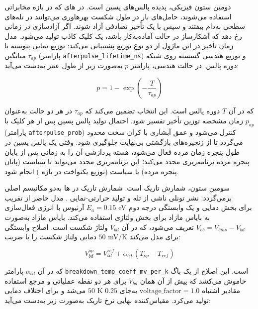 دومین ستون فیزیکی، پدیده پالس‌های پسین  است. در های  که در بازه مخابراتی  استفاده می‌شوند، حامل‌های بار در طول شکست بهرهاوری می‌توانند در تله‌های سطحی  به‌دام بیفتند و سپس با یک تأخیر تصادفی آزاد شوند. اگر آزادسازی در زمانی رخ دهد که آشکارساز در حالت آماده‌به‌کار باشد، یک کلیک کاذب  تولید می‌شود. مدل زمان تأخیر در این ماژول از دو نوع توزیع پشتیبانی می‌کند: توزیع نمایی پیوسته با میانگین $\tau_{ap}$ (پارامتر \texttt{afterpulse\_lifetime\_ns}) و توزیع هندسی گسسته روی شبکه دوره پالس. در حالت هندسی، پارامتر $p$ به‌صورت زیر از طول عمر به‌دست می‌آید:

\begin{equation}
	p = 1 - \exp\left(-\frac{T}{\tau_{ap}}\right)
\end{equation}

که در آن $T$ دوره پالس  است. این انتخاب تضمین می‌کند که $\tau_{ap}$ در هر دو حالت به‌عنوان زمان مشخصه توزین تأخیر تفسیر شود. احتمال تولید پالس پسین پس از هر کلیک با $p_{ap}$ (پارامتر \texttt{afterpulse\_prob}) کنترل می‌شود و عمق آبشاری  با کران سخت  محدود می‌گردد تا از زنجیره‌های بازگشتی بی‌نهایت جلوگیری شود. وقتی یک پالس پسین در طول پنجره زمان مرده فعال می‌شود، هسته پردازشی آن را به زمانی پس از پایان پنجره مرده برنامه‌ریزی مجدد می‌کند؛ این برنامه‌ریزی مجدد می‌تواند با سیاست  (پایان پنجره مرده) یا سیاست  (توزیع یکنواخت در بازه ) انجام شود.

سومین ستون، شمارش تاریک  است. شمارش تاریک در ها به‌دو مکانیسم اصلی برمی‌گردد: نشر تونلی ناشی از تله  و تولید حرارتی-نمایی . مدل حاضر از تقریب آرنیوس  با انرژی فعال‌سازی $E_a = 0.15$ eV برای بخش دمایی و یک وابستگی درجه دوم به بایاس مازاد  برای بخش ولتاژی استفاده می‌کند. بایاس مازاد به‌صورت $V_{eb} = V_{bias} - V_{bd}$ تعریف می‌شود، که در آن $V_{bd}$ ولتاژ شکست است. اصلاح  وابستگی دمایی ولتاژ شکست را با ضریب $50$ mV/K برای  مدل می‌کند:

\begin{equation}
	V_{bd}^{op} = V_{bd}^{ref} + \alpha_{bd}\,(T_{op} - T_{ref})
\end{equation}

که در آن $\alpha_{bd}$ پارامتر \texttt{breakdown\_temp\_coeff\_mv\_per\_k} است. این اصلاح از یک باگ خاموش می‌کشد که پیش از آن همان $V_{bd}$ برای هر دو نقطه عملیاتی و مرجع استفاده می‌شد و برای اختلاف دمایی $50$ K مقادیر اشتباه $\text{voltage\_factor} = 1.0$ به‌جای $0.25$ تولید می‌کرد. مقیاس‌کننده نهایی نرخ تاریک  به‌صورت زیر به‌دست می‌آید:

